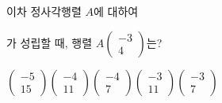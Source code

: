 \hspace*{2mm}\begin{minipage}[t]{\dimexpr\linewidth-2mm\relax}\vspace{0pt}
이차 정사각행렬 $A$에 대하여 \par\smallskip{}\par\smallskip\noindent 가 성립할 때, 행렬 $A\begin{pmatrix} -3 \\ 4 \end{pmatrix}$는?
\begin{choices32}{$\begin{pmatrix} -5 \\ 15 \end{pmatrix}$}{$\begin{pmatrix} -4 \\ 11 \end{pmatrix}$}{$\begin{pmatrix} -4 \\ 7 \end{pmatrix}$}{$\begin{pmatrix} -3 \\ 11 \end{pmatrix}$}{$\begin{pmatrix} -3 \\ 7 \end{pmatrix}$}\end{choices32}\end{minipage}
